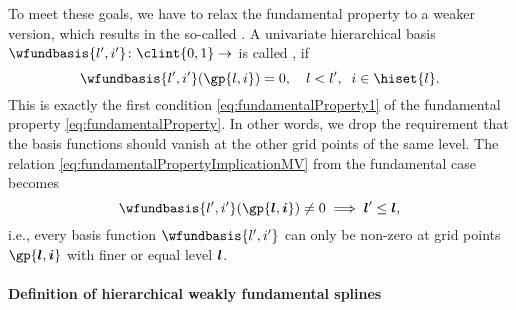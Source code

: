 To meet these goals, we have to relax the fundamental property
to a weaker version, which results in the so-called
.
A univariate hierarchical basis
$\wfundbasis{l',i'}\colon \clint{0, 1} \to \real$
is called , if
\begin{equation}
  \label{eq:weaklyFundamentalProperty}
  \wfundbasis{l',i'}(\gp{l,i}) = 0,\quad
  l < l',\;\;
  i \in \hiset{l}.
\end{equation}
This is exactly the first condition \eqref{eq:fundamentalProperty1}
of the fundamental property \eqref{eq:fundamentalProperty}.
In other words, we drop the requirement that the basis functions
should vanish at the other grid points of the same level.
The relation \eqref{eq:fundamentalPropertyImplicationMV} from the
fundamental case becomes
\begin{equation}
  \label{eq:weaklyFundamentalPropertyImplicationMV}
  \wfundbasis{l',i'}(\gp{\*l,\*i})
  \not= 0
  \implies
  \*l' \le \*l,
\end{equation}
i.e., every basis function $\wfundbasis{l',i'}$
can only be non-zero at grid points $\gp{\*l,\*i}$ with
finer or equal level ${\boldsymbol{l}}$.

\paragraph{Definition of hierarchical weakly fundamental splines}

